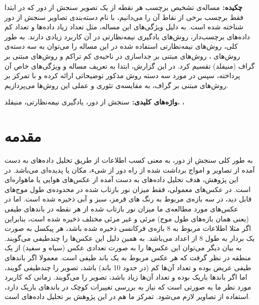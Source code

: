 \documentclass[11pt]{article}
\begin{document}



{\bf {چکيده: }}
مساله‌ی تشخیص برچسب هر نقطه از یک تصویر سنجش از دور که در ابتدا فقط برچسب برخی از نقاط آن را می‌دانیم، با نام دسته‌بندی تصاویر سنجش از دور شناخته شده است. به دلیل ویژگی‌های این مساله، مثل تعداد زیاد داده‌ها و تعداد کم داده‌های برچسب‌دار، روش‌های یادگیری نیمه‌نظارتی در آن کاربرد زیادی دارند. به طور کلی، روش‌های نیمه‌نظارتی استفاده شده در این مساله را می‌توان به سه دسته‌ی روش‌های \generative{}، روش‌های مبتنی بر جداسازی در ناحیه‌ی کم تراکم و روش‌های مبتنی بر گراف (منیفلد) تقسیم کرد. در این گزارش، ابتدا به تعریف مساله و ویژگی‌های خاص آن پرداخته، سپس در مورد سه دسته روش مذکور توضیحاتی ارائه کرده و با تمرکز بر روش‌های مبتنی بر گراف، به مقایسه‌ی تئوری و عملی این روش‌ها می‌پردازیم.

{\bf  { واژه‌های کلیدی: }}
 سنجش از دور، یادگیری نیمه‌نظارتی، منیفلد، \multispec{}، \hyperspec{}


\setlength{\parindent}{0.25in} %

\section{مقدمه}\label{intro}

به طور کلی سنجش از دور، به معنی کسب اطلاعات از طریق تحلیل داده‌های به دست آمده از تصاویر و امواج برداشت شده از راه دور از شیء، مکان یا پدیده‌ای می‌باشد. در این پژوهش، هدف تحلیل داده‌های به دست آمده از عکس‌های هوایی یا ماهواره‌ای است. در عکس‌های  معمولی، فقط میزان نور بازتاب شده در محدوده‌ی طول موج‌های قابل دید، در سه بازه‌ی مربوط به رنگ های قرمز،
سبز
و آبی
 ذخیره شده است. اما در عکس‌های مورد مطالعه‌ی ما میزان نور بازتاب شده از هر نقطه در باندهای طیفی (یعنی همان بازه‌های طول موج) مرئی و غیر مرئی مختلف ذخیره شده است، بنابراین اگر مثلا اطلاعات مربوط به 8 بازه‌ی فرکانسی ذخیره شده باشد، هر پیکسل به صورت یک بردار به طول 8 از اعداد می‌باشد. به همین دلیل این عکس‌ها را چندطیفی
می‌گویند‌. به بیان دیگر  می‌توان این عکس‌ها را به صورت تعدادی عکس (سیاه و سفید) از یک منطقه در نظر گرفت که هر عکس مربوط به یک باند طیفی است. 
معمولا اگر باندهای طیفی عریض بوده و تعداد آن‌ها کم (در حدود 10 باند) باشد، تصویر را چندطیفی گویند، اما اگر باندها باریک بوده و تعداد آن‌ها زیاد باشد، تصویر را \hyperspec{}  می‌گویند. زمانی که کاربرد مورد نظر ما به صورتی است که نیاز به بررسی تغییرات کوچک در باندهای باریک دارد، استفاده از تصاویر \hyperspec{} لازم می‌شود. تمرکز ما هم در این پژوهش بر تحلیل داده‌های \hyperspec{} است.
\end{document}
